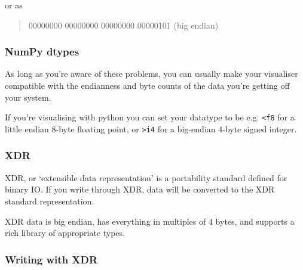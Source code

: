 or as

\begin{quote}
00000000 00000000 00000000 00000101 (big endian)
\end{quote}

\subsubsection{NumPy dtypes}\label{numpy-dtypes}

As long as you're aware of these problems, you can usually make your
visualiser compatible with the endianness and byte counts of the data
you're getting off your system.

If you're visualising with python you can set your datatype to be e.g.
\texttt{\textless{}f8} for a little endian 8-byte floating point, or
\texttt{\textgreater{}i4} for a big-endian 4-byte signed integer.

\subsubsection{XDR}\label{xdr}

XDR, or `extensible data representation' is a portability standard
defined for binary IO. If you write through XDR, data will be converted
to the XDR standard representation.

XDR data is big endian, has everything in multiples of 4 bytes, and
supports a rich library of appropriate types.

\subsubsection{Writing with XDR}\label{writing-with-xdr}

\begin{Shaded}
\begin{Highlighting}[]

\end{Highlighting}
\end{Shaded}

\begin{Shaded}
\begin{Highlighting}[]

 

   \NormalTok{<}
  \NormalTok{(}\NormalTok{),}
\NormalTok{\}}
\end{Highlighting}
\end{Shaded}

